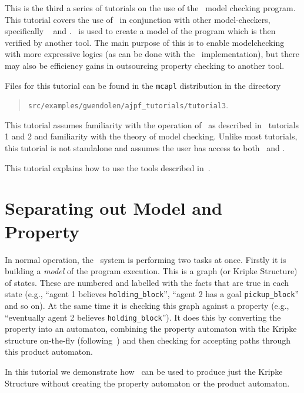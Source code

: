 
This is the third a series of tutorials on the use of the \ajpf\ model checking program.  This tutorial covers the use of \ajpf\ in conjunction with other model-checkers, specifically \spin\  and \prism{}.  \ajpf\ is used to create a model of the program which is then verified by another tool.  The main purpose of this is to enable modelchecking with more expressive logics (as can be done with the \prism\ implementation), but there may also be efficiency gains in outsourcing property checking to another tool.

Files for this tutorial can be found in the \texttt{mcapl} distribution in the directory 
\begin{quote}
\texttt{src/examples/gwendolen/ajpf\_tutorials/tutorial3}.
\end{quote}

This tutorial assumes familiarity with the operation of \ajpf\ as described in \ajpf\ tutorials 1 and 2 and familiarity with the theory of model checking.  Unlike most tutorials, this tutorial is not standalone and assumes the user has access to both \spin\ and \prism{}.

This tutorial explains how to use the tools described in~\cite{dennis15:_two}.

\section{Separating out Model and Property}

In normal operation, the \ajpf\ system is performing two tasks at once.  Firstly it is building a \emph{model} of the program execution.  This is a graph (or Kripke Structure) of states.  These are numbered and labelled with the facts that are true in each state (e.g., ``agent 1 believes \texttt{holding\_block}'', ``agent 2 has a goal \texttt{pickup\_block}'' and so on).  At the same time it is checking this graph against a property (e.g., ``eventually agent 2 believes \texttt{holding\_block}'').  It does this by converting the property into an automaton, combining the property automaton with the Kripke structure on-the-fly (following~\cite{Gerth:1995:SOA:645837.670574,Courcoubetis92mea}) and then checking for accepting paths through this product automaton.

In this tutorial we demonstrate how \ajpf\ can be used to produce just the Kripke Structure without creating the property automaton or the product automaton.

